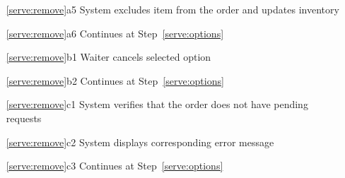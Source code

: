 \documentclass[a4paper,11pt,oneside]{book}
\makeatletter
\newcommand{\cancel}[1]{#1 cancels selected option}
\newcommand{\goto}[1]{Continues at Step~\ref{#1}}
\newcommand{\customlabel}[2]{#2\def\@currentlabel{#2}\label{#1}}
\makeatother
\begin{document}
\begin{enumerate}
\begin{enumerate}
\begin{enumerate}
        \end{enumerate}
      \item [\ref{serve:remove}a5] System excludes item from the order and updates inventory
      \item [\customlabel{serve:exclude}{\ref{serve:remove}a6}] \goto{serve:options}
    \end{enumerate}
    \begin{enumerate}
      \item [\ref{serve:remove}b1] \cancel{Waiter}
      \item [\ref{serve:remove}b2] \goto{serve:options}
    \end{enumerate}
    \begin{enumerate}
      \item [\ref{serve:remove}c1] System verifies that the order does not have pending requests
      \item [\ref{serve:remove}c2] System displays corresponding error message
      \item [\ref{serve:remove}c3] \goto{serve:options}
    \end{enumerate}


\end{enumerate}
\end{document}

